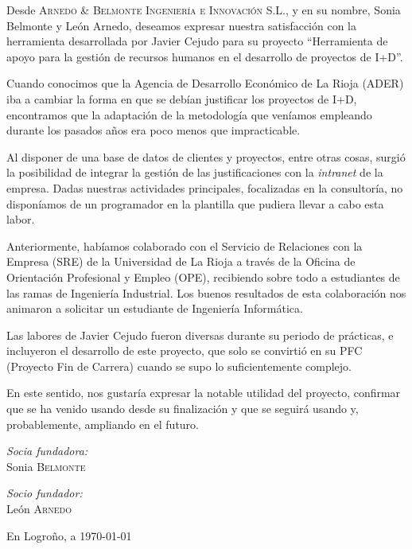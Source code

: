 Desde \textsc{Arnedo \& Belmonte Ingeniería e Innovación S.L.}, y en su nombre,
Sonia Belmonte y León Arnedo, deseamos expresar nuestra satisfacción con la
herramienta desarrollada por Javier Cejudo para su proyecto ``Herramienta de
apoyo para la gestión de recursos humanos en el desarrollo de proyectos de
I+D''.

Cuando conocimos que la Agencia de Desarrollo Económico de La Rioja (ADER) iba a
cambiar la forma en que se debían justificar los proyectos de I+D, encontramos
que la adaptación de la metodología que veníamos empleando durante los pasados
años era poco menos que impracticable.

Al disponer de una base de datos de clientes y proyectos, entre otras cosas,
surgió la posibilidad de integrar la gestión de las justificaciones con la
\textit{intranet} de la empresa. Dadas nuestras actividades principales,
focalizadas en la consultoría, no disponíamos de un programador en la plantilla
que pudiera llevar a cabo esta labor.

Anteriormente, habíamos colaborado con el Servicio de Relaciones con la Empresa
(SRE) de la Universidad de La Rioja a través de la Oficina de Orientación
Profesional y Empleo (OPE), recibiendo sobre todo a estudiantes de las ramas de
Ingeniería Industrial. Los buenos resultados de esta colaboración nos animaron
a solicitar un estudiante de Ingeniería Informática.

Las labores de Javier Cejudo fueron diversas durante su periodo de prácticas,
e incluyeron el desarrollo de este proyecto, que solo se convirtió en su PFC
(Proyecto Fin de Carrera) cuando se supo lo suficientemente complejo.

En este sentido, nos gustaría expresar la notable utilidad del proyecto,
confirmar que se ha venido usando desde su finalización y que se seguirá usando
y, probablemente, ampliando en el futuro.

\quad

\begin{minipage}{0.4\textwidth}
\begin{flushleft}
\emph{Socia fundadora:}\\
Sonia \textsc{Belmonte}
\end{flushleft}
\end{minipage}
\begin{minipage}{0.4\textwidth}
\begin{flushright}
\emph{Socio fundador:} \\
León \textsc{Arnedo}
\end{flushright}
\end{minipage}

\vfill

En Logroño, a \today
